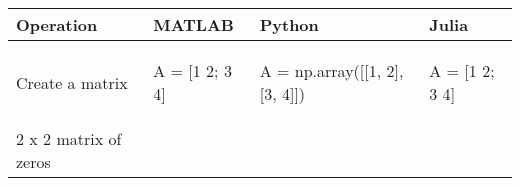 \documentclass[10pt, landscape]{article}
\newenvironment{Shaded}{}{}
\newcommand{\DecValTok}[1]{\textcolor[rgb]{0.25,0.63,0.44}{{#1}}}
\newcommand{\FloatTok}[1]{\textcolor[rgb]{0.25,0.63,0.44}{{#1}}}
\newcommand{\OperatorTok}[1]{\textcolor[rgb]{0.40,0.40,0.40}{{#1}}}
\newcommand{\NormalTok}[1]{{#1}}
\begin{document}
\begin{multicols}{2}
\begin{tabular}[ ]{@{}llll@{}}
\toprule
\begin{minipage}[b]{0.24\columnwidth}\raggedright\strut
Operation\strut
\end{minipage} & \begin{minipage}[b]{0.20\columnwidth}\raggedright\strut
MATLAB\strut
\end{minipage} & \begin{minipage}[b]{0.25\columnwidth}\raggedright\strut
Python\strut
\end{minipage} & \begin{minipage}[b]{0.20\columnwidth}\raggedright\strut
Julia\strut
\end{minipage}\tabularnewline
\midrule
\begin{minipage}[t]{0.24\columnwidth}\raggedright\strut
Create a matrix\strut
\end{minipage} & \begin{minipage}[t]{0.20\columnwidth}\raggedright\strut
\begin{Shaded}
\begin{Highlighting}[]
\NormalTok{A = [}\FloatTok{1} \FloatTok{2}\NormalTok{; }\FloatTok{3} \FloatTok{4}\NormalTok{]}
\end{Highlighting}
\end{Shaded}
\strut
\end{minipage} & \begin{minipage}[t]{0.25\columnwidth}\raggedright\strut
\begin{Shaded}
\begin{Highlighting}[]
\NormalTok{A }\OperatorTok{=} \NormalTok{np.array([[}\DecValTok{1}\NormalTok{, }\DecValTok{2}\NormalTok{], [}\DecValTok{3}\NormalTok{, }\DecValTok{4}\NormalTok{]])}
\end{Highlighting}
\end{Shaded}
\strut
\end{minipage} & \begin{minipage}[t]{0.20\columnwidth}\raggedright\strut
\begin{Shaded}
\begin{Highlighting}[]
\NormalTok{A = [}\FloatTok{1} \FloatTok{2}\NormalTok{; }\FloatTok{3} \FloatTok{4}\NormalTok{]}
\end{Highlighting}
\end{Shaded}
\strut
\end{minipage}\tabularnewline
\begin{minipage}[t]{0.24\columnwidth}\raggedright\strut
2 x 2 matrix of zeros\strut

\end{minipage}
\end{tabular}
\end{multicols}
\end{document}
